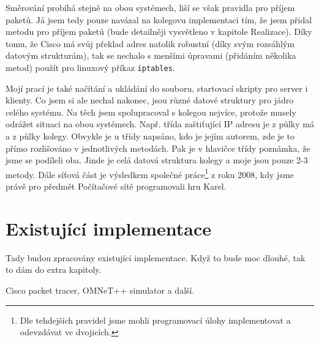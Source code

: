 Směrování probíhá stejně na obou systémech, liší se však pravidla pro příjem paketů. Já jsem tedy pouze navázal na kolegovu implementaci tím, že jsem přidal metodu pro příjem paketů (bude detailněji vysvětleno v kapitole Realizace). Díky tomu, že Cisco má svůj překlad adres natolik robustní (díky svým rozsáhlým datovým strukturám), tak se nechalo s menšími úpravami (přidáním několika metod) použít pro linuxový příkaz \verb|iptables|. 

Mojí prací je také načítání a ukládání do souboru, startovací skripty pro server i klienty. Co jsem si ale nechal nakonec, jsou různé datové struktury pro jádro celého systému. Na těch jsem spolupracoval s kolegou nejvíce, protože musely odrážet situaci na obou systémech. Např. třída zaštiťující IP adresu je z půlky má a z půlky kolegy. Obvykle je u třídy napsáno, kdo je jejím autorem, zde je to přímo rozlišováno v jednotlivých metodách. Pak je v hlavičce třídy poznámka, že jsme se podíleli oba. Jinde je celá datová struktura kolegy a moje jsou pouze 2-3 metody. Dále síťová část je výsledkem společné práce\footnote{Dle tehdejších pravidel jsme mohli programovací úlohy implementovat a odevzdávat ve dvojicích.} z roku 2008, kdy jsme právě pro předmět Počítačové sítě programovali hru Karel.


\section{Existující implementace}
Tady budou zpracovány existující implementace. Když to bude moc dlouhé, tak to dám do extra kapitoly.

Cisco packet tracer, OMNeT++ simulator a další.









